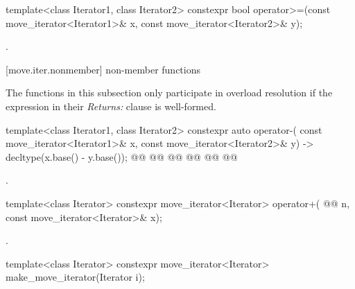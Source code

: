 %
\begin{itemdecl}
template<class Iterator1, class Iterator2>
constexpr bool operator>=(const move_iterator<Iterator1>& x, const move_iterator<Iterator2>& y);
\end{itemdecl}

\begin{itemdescr}
\pnum
\returns {}.
\end{itemdescr}

[move.iter.nonmember]{ non-member functions}

\begin{addedblock}
\pnum
The functions in this subsection only participate in overload resolution if the
expression in their \textit{Returns:} clause is well-formed.
\end{addedblock}

%
\begin{itemdecl}
template<class Iterator1, class Iterator2>
  constexpr auto operator-(
    const move_iterator<Iterator1>& x,
    const move_iterator<Iterator2>& y) -> decltype(x.base() - y.base());
@@
@@
    @@
@@
@@
    @@
\end{itemdecl}

\begin{itemdescr}
\pnum
\returns {}.
\end{itemdescr}

%
\begin{itemdecl}
template<class Iterator>
  constexpr move_iterator<Iterator> operator+(
    @@ n,
    const move_iterator<Iterator>& x);
\end{itemdecl}

\begin{itemdescr}
\pnum
\returns {}.
\end{itemdescr}

%
\begin{itemdecl}
template<class Iterator>
constexpr move_iterator<Iterator> make_move_iterator(Iterator i);
\end{itemdecl}

